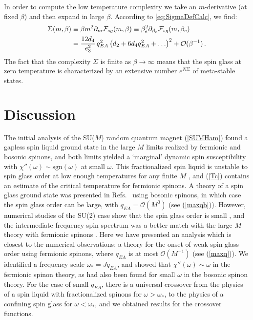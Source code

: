 \documentclass[aps,prx,preprint,onecolumn,citeautoscript,superscriptaddress,nofootinbib,
eqsecnum]{revtex4}
\begin{document}
{In order to compute the low temperature complexity we take an $m$-derivative (at fixed $\beta$) and then expand in large $\beta$. According to \eqref{eq:SigmaDefCalc}, we find:
\begin{equation}
\begin{split}
 \Sigma(m,\beta)& \equiv \beta m^2 \partial_m  {\cal F}_{sg}(m,\beta)   \equiv \beta_e^2 \partial_{\beta_e} {\cal F}_{sg}(m,\beta_e)\\
 & = \frac{12 d_4}{e_3^2}\, q_{EA}^2 \left( d_2  + 6d_4 q_{EA}^2 + \ldots  \right)^2 + {\cal O}(\beta^{-1}) \,.
\end{split}
\end{equation}
The fact that the complexity $\Sigma$ is finite as $\beta \rightarrow \infty$ means that the spin glass at zero temperature is characterized by an extensive number $e^{N\Sigma}$ of meta-stable states.

\section{Discussion}

The initial analysis \cite{SY92} of the SU($M$) random quantum magnet (\ref{SUMHam}) found a gapless spin liquid ground state in the large $M$ limits realized by fermionic and bosonic spinons, and both limits yielded a `marginal' dynamic spin susceptibility with $\chi'' (\omega) \sim \mbox{sgn} (\omega)$ at small $\omega$. 
This fractionalized spin liquid is unstable to spin glass order at low enough temperatures for any finite $M$ \cite{GPS01}, and (\ref{Tc}) contains an estimate of the critical temperature for fermionic spinons.
A theory of a spin glass ground state was presented in Refs.~\cite{GPS00,GPS01} using bosonic spinons, in which case the spin glass order can be large, with $q_{EA} = \mathcal{O}(M^0)$ (see (\ref{maxqb})). However, numerical studies of the SU(2) case show that the spin glass order is small \cite{ArracheaRozenbergSG2002,Shackleton2021}, and the intermediate frequency spin spectrum was a better match with the large $M$ theory with fermionic spinons \cite{Shackleton2021,Tikhanovskaya:2020elb}. Here we have presented an analysis which is closest to the numerical observations: a theory for the onset of weak spin glass order using fermionic spinons, where $q_{EA}$ is at most $\mathcal{O}(M^{-1})$ (see (\ref{maxq})). We identified a frequency scale $\omega_\ast = J q_{EA}$, and showed that $\chi'' (\omega) \sim \omega$ in the fermionic spinon theory, as had also been found for small $\omega$ in the bosonic spinon theory. For the case of small $q_{EA}$, there is a universal crossover from the physics of a spin liquid with fractionalized spinons for $\omega > \omega_\ast$, to the physics of a confining spin glass for $\omega < \omega_\ast$, and we obtained results for the crossover functions.

}
\end{document}
